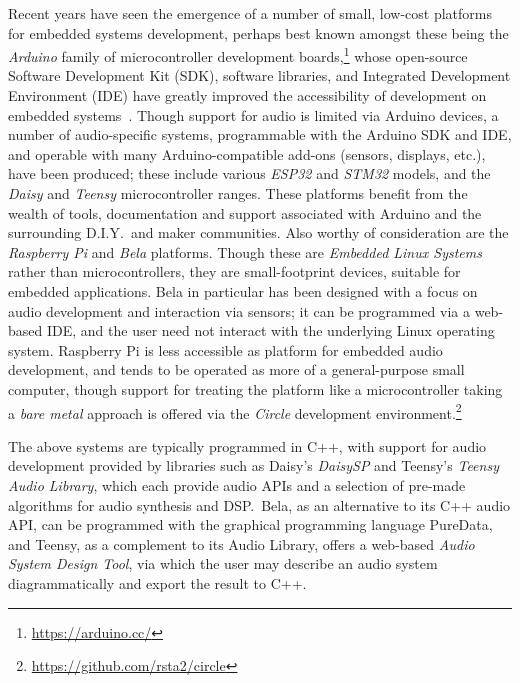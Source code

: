 \documentclass[utf8]{FrontiersinHarvard}
\begin{document}
    Recent years have seen the emergence of a number of small, low-cost
    platforms for embedded systems development, perhaps best known amongst these
    being the \textit{Arduino} family of microcontroller development
    boards,\footnote{
        \url{https://arduino.cc/}
    } whose open-source Software Development Kit
    (SDK), software libraries, and Integrated Development Environment (IDE) have
    greatly improved the accessibility of development on embedded
    systems~\citep{michon_embedded_2020}.
    Though support for audio is limited via Arduino devices, a number of
    audio-specific systems, programmable with the Arduino SDK and IDE, and
    operable with many Arduino-compatible add-ons (sensors, displays, etc.),
    have been produced;
    these include various \textit{ESP32} and \textit{STM32} models, and the
    \textit{Daisy} and \textit{Teensy} microcontroller ranges.
    These platforms benefit from the wealth of tools, documentation and support
    associated with Arduino and the surrounding D.I.Y.\ and maker communities.
    Also worthy of consideration are the \textit{Raspberry Pi} and \textit{Bela}
    platforms.
    Though these are \textit{Embedded Linux Systems} rather than
    microcontrollers, they are small-footprint devices, suitable for embedded
    applications.
    Bela in particular has been designed with a focus on audio development and
    interaction via sensors; it can be programmed via a web-based IDE, and the
    user need not interact with the underlying Linux operating system.
    Raspberry Pi is less accessible as platform for embedded audio development,
    and tends to be operated as more of a general-purpose small computer, though
    support for treating the platform like a microcontroller \textemdash{}
    taking a \textit{bare metal} approach \textemdash{} is offered via the
    \textit{Circle} development environment.\footnote{\url{https://github.com/rsta2/circle}}

    The above systems are typically programmed in C++, with support for audio
    development provided by libraries such as Daisy's \textit{DaisySP} and Teensy's
    \textit{Teensy Audio Library}, which each provide audio APIs and a selection of
    pre-made algorithms for audio synthesis and DSP.\
    Bela, as an alternative to its C++ audio API, can be programmed with the
    graphical programming language PureData, and Teensy, as a complement to its
    Audio Library, offers a web-based \textit{Audio System Design Tool}, via which
    the user may describe an audio system diagrammatically and export the result to
    C++.
\end{document}

